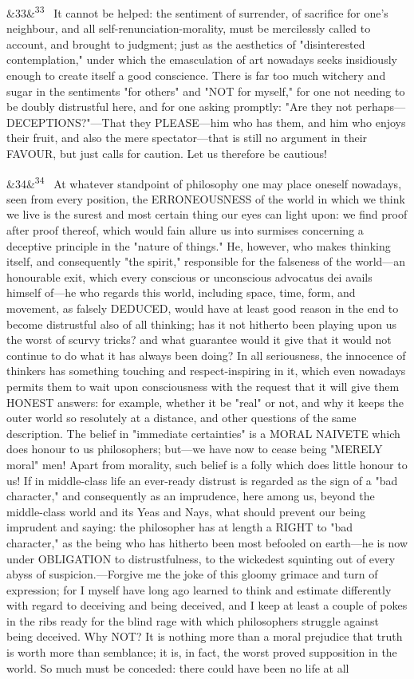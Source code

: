 \documentclass[12pt]{article}
\newcommand{\para}[1][]{\par\noindent\ifx&#1&\else\textsuperscript{\footnotesize #1}~\fi}
\begin{document}
\para[33] It cannot be helped: the sentiment of surrender, of sacrifice for one's neighbour, and all self-renunciation-morality, must be mercilessly called to account, and brought to judgment; just as the aesthetics of "disinterested contemplation," under which the emasculation of art nowadays seeks insidiously enough to create itself a good conscience. There is far too much witchery and sugar in the sentiments "for others" and "NOT for myself," for one not needing to be doubly distrustful here, and for one asking promptly: "Are they not perhaps---DECEPTIONS?"---That they PLEASE---him who has them, and him who enjoys their fruit, and also the mere spectator---that is still no argument in their FAVOUR, but just calls for caution. Let us therefore be cautious!

\para[34] At whatever standpoint of philosophy one may place oneself nowadays, seen from every position, the ERRONEOUSNESS of the world in which we think we live is the surest and most certain thing our eyes can light upon: we find proof after proof thereof, which would fain allure us into surmises concerning a deceptive principle in the "nature of things." He, however, who makes thinking itself, and consequently "the spirit," responsible for the falseness of the world---an honourable exit, which every conscious or unconscious advocatus dei avails himself of---he who regards this world, including space, time, form, and movement, as falsely DEDUCED, would have at least good reason in the end to become distrustful also of all thinking; has it not hitherto been playing upon us the worst of scurvy tricks? and what guarantee would it give that it would not continue to do what it has always been doing? In all seriousness, the innocence of thinkers has something touching and respect-inspiring in it, which even nowadays permits them to wait upon consciousness with the request that it will give them HONEST answers: for example, whether it be "real" or not, and why it keeps the outer world so resolutely at a distance, and other questions of the same description. The belief in "immediate certainties" is a MORAL NAIVETE which does honour to us philosophers; but---we have now to cease being "MERELY moral" men! Apart from morality, such belief is a folly which does little honour to us! If in middle-class life an ever-ready distrust is regarded as the sign of a "bad character," and consequently as an imprudence, here among us, beyond the middle-class world and its Yeas and Nays, what should prevent our being imprudent and saying: the philosopher has at length a RIGHT to "bad character," as the being who has hitherto been most befooled on earth---he is now under OBLIGATION to distrustfulness, to the wickedest squinting out of every abyss of suspicion.---Forgive me the joke of this gloomy grimace and turn of expression; for I myself have long ago learned to think and estimate differently with regard to deceiving and being deceived, and I keep at least a couple of pokes in the ribs ready for the blind rage with which philosophers struggle against being deceived. Why NOT? It is nothing more than a moral prejudice that truth is worth more than semblance; it is, in fact, the worst proved supposition in the world. So much must be conceded: there could have been no life at all 
\end{document}
